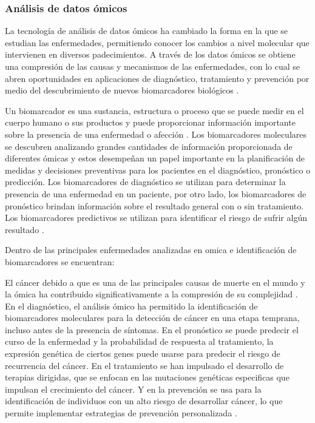 \subsubsection{Análisis de datos ómicos}

La tecnología de análisis de datos ómicos ha cambiado la forma en la que se estudian las enfermedades, permitiendo conocer los cambios a nivel molecular que intervienen en diversos padecimientos. A través de los datos ómicos se obtiene una compresión de las causas y mecanismos de las enfermedades, con lo cual se abren oportunidades en aplicaciones de diagnóstico, tratamiento y prevención por medio del descubrimiento de nuevos biomarcadores biológicos \citep{reel2021using}.

Un biomarcador es una sustancia, estructura o proceso que se puede medir en el cuerpo humano o sus productos y puede proporcionar información importante sobre la presencia de una enfermedad o afección \citep{strimbu2010biomarkers}. Los biomarcadores moleculares se descubren analizando grandes cantidades de información proporcionada de diferentes ómicas y estos desempeñan un papel importante en la planificación de medidas y decisiones preventivas para los pacientes en el diagnóstico, pronóstico o predicción. Los biomarcadores de diagnóstico se utilizan para determinar la presencia de una enfermedad en un paciente, por otro lado, los biomarcadores de pronóstico brindan información sobre el resultado general con o sin tratamiento. Los biomarcadores predictivos se utilizan para identificar el riesgo de sufrir algún resultado \citep{carlomagno2017diagnostic}.

Dentro de las principales enfermedades analizadas en omica e identificación de biomarcadores se encuentran:

El cáncer debido a que es una de las principales causas de muerte en el mundo y la ómica ha contribuido significativamente a la compresión de su complejidad \citep{sarmiento2020aplicaciones}. En el diagnóstico, el análisis ómico ha permitido la identificación de biomarcadores moleculares para la detección de cáncer en una etapa temprana, incluso antes de la presencia de síntomas. En el pronóstico se puede predecir el curso de la enfermedad y la probabilidad de respuesta al tratamiento, la expresión genética de ciertos genes puede usarse para predecir el riesgo de recurrencia del cáncer. En el tratamiento se han impulsado el desarrollo de terapias dirigidas, que se enfocan en las mutaciones genéticas especificas que impulsan el crecimiento del cáncer. Y en la prevención se usa para la identificación de individuos con un alto riesgo de desarrollar cáncer, lo que permite implementar estrategias de prevención personalizada \citep{munir2019cancer}.

